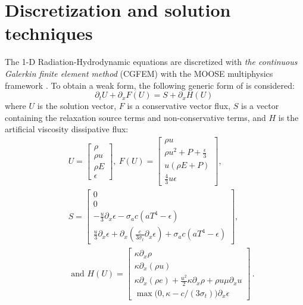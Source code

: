 \documentclass[review]{elsarticle}
\begin{document}
\section{Discretization and solution techniques}\label{sec:discr}
%
The 1-D Radiation-Hydrodynamic equations  are discretized with \emph{the continuous Galerkin finite element method} (CGFEM) with the MOOSE multiphysics framework \cite{Moose}. To obtain a weak form, the following generic form of  is considered:
\begin{equation}
\label{eq:form}
\partial_t U + \partial_x F \left( U \right) = S + \partial_x H \left(U\right) \,
\end{equation}
where $U$ is the solution vector, $F$ is a conservative vector flux, $S$ is a vector containing the relaxation source terms and non-conservative terms, and $H$ is the artificial viscosity dissipative flux:
\begin{eqnarray*}
&&U = 
\begin{bmatrix}
\rho \\
\rho u \\
\rho E \\
\epsilon
\end{bmatrix}
,\
F(U) = 
\begin{bmatrix}
\rho u \\
\rho u^2 + P + \frac{\epsilon}{3} \\
u \left( \rho E + P \right) \\
\frac{4}{3} u \epsilon
\end{bmatrix}
,\ \\
&&S = 
\begin{bmatrix}
0 \\
0 \\
-\frac{u}{3} \partial_x \epsilon - \sigma_a c \left( a T^4 - \epsilon \right) \\
\frac{u}{3} \partial_x \epsilon + \partial_x \left( \frac{c}{3 \sigma_t} \partial_x \epsilon \right) + \sigma_a c \left( a T^4 - \epsilon \right)
\end{bmatrix}
,
\\
&&\text{ and } 
H(U) = 
\begin{bmatrix}
\kappa \partial_x \rho \\
\kappa \partial_x (\rho u) \\
\kappa \partial_x \left( \rho e \right) + \frac{u^2}{2} \kappa \partial_x \rho + \rho u \mu \partial_x u \\
\max \big( 0, \kappa- c/(3 \sigma_t) \big) \partial_x \epsilon 
\end{bmatrix} \,.
\end{eqnarray*}
\end{document}
